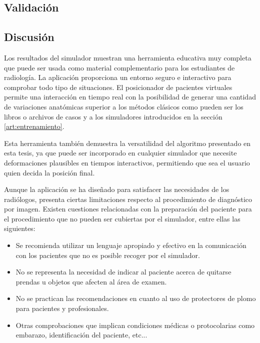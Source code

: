 
\subsection{Validación}

\subsection{Discusión}
\label{xray:discusion}
Los resultados del simulador muestran una herramienta educativa muy completa que puede ser usada como material complementario para los estudiantes de radiología. La aplicación proporciona un entorno seguro e interactivo para comprobar todo tipo de situaciones. El posicionador de pacientes virtuales permite una interacción en tiempo real con la posibilidad de generar una cantidad de variaciones anatómicas superior a los métodos clásicos como pueden ser los libros o archivos de casos y a los simuladores introducidos en la sección \ref{art:entrenamiento}.

Esta herramienta también demuestra la versatilidad del algoritmo presentado en esta tesis, ya que puede ser incorporado en cualquier simulador que necesite deformaciones plausibles en tiempos interactivos, permitiendo que sea el usuario quien decida la posición final.

Aunque la aplicación se ha diseñado para satisfacer las necesidades de los radiólogos, presenta ciertas limitaciones respecto al procedimiento de diagnóstico por imagen. Existen cuestiones relacionadas con la preparación del paciente para el procedimiento que no pueden ser cubiertas por el simulador, entre ellas las siguientes:

\begin{itemize}
    \item Se recomienda utilizar un lenguaje apropiado y efectivo en la comunicación con los pacientes que no es posible recoger por el simulador.
    \item No se representa la necesidad de indicar al paciente acerca de quitarse prendas u objetos que afecten al área de examen.
    \item No se practican las recomendaciones en cuanto al uso de protectores de plomo para pacientes y profesionales.
    \item Otras comprobaciones que implican condiciones médicas o protocolarias como embarazo, identificación del paciente, etc...
\end{itemize}
